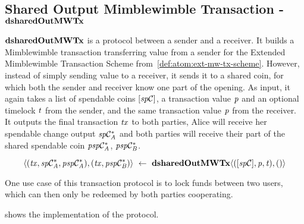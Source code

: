 \subsection{Shared Output Mimblewimble Transaction - $\mathbf{dsharedOutMWTx}$} \label{subsec:atom:shared-out-mw-tx}

$\mathbf{dsharedOutMWTx}$ is a protocol between a sender and a receiver.
It builds a Mimblewimble transaction transferring value from a sender for the Extended Mimblewimble Transaction Scheme from~\cref{def:atom:ext-mw-tx-scheme}.
However, instead of simply sending value to a receiver, it sends it to a shared coin, for which both the sender and receiver know one part of the opening.
As input, it again takes a list of spendable coins $[\mathit{sp}\mathcal{C}]$, a transaction value $\mathit{p}$ and an optional timelock $\mathit{t}$ from the sender, and the same transaction value $\mathit{p}$ from the receiver.
It outputs the final transaction $\mathit{tx}$ to both parties, Alice will receive her spendable change output $\mathit{sp}\mathcal{C}_{\mathit{A}}^*$ and both parties will receive their part of the shared spendable coin $\mathit{psp}\mathcal{C}_{\mathit{A}}^*$, $\mathit{psp}\mathcal{C}_{\mathit{B}}^*$.

\[ \langle (\mathit{tx}, \mathit{sp}\mathcal{C}_{\mathit{A}}^*, \mathit{psp}\mathcal{C}_{\mathit{A}}^*), (\mathit{tx}, \mathit{psp}\mathcal{C}_{\mathit{B}}^*) \rangle ~\leftarrow~ \mathbf{dsharedOutMWTx} \langle([\mathit{sp}\mathcal{C}],\mathit{p},\mathit{t}), () \rangle \]

One use case of this transaction protocol is to lock funds between two users, which can then only be redeemed by both parties cooperating.

 shows the implementation of the protocol.

